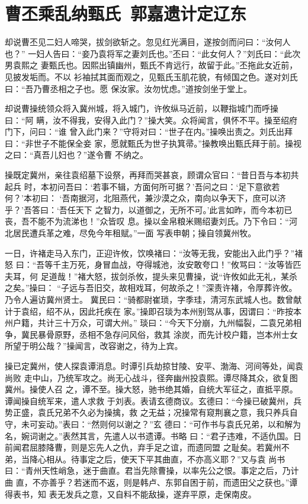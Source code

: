 \chapter{曹丕乘乱纳甄氏~郭嘉遗计定辽东}

却说曹丕见二妇人啼哭，拔剑欲斩之。忽见红光满目，遂按剑而问曰：“汝何人也？”
一妇人告曰：“妾乃袁将军之妻刘氏也。”丕曰：“此女何人？”刘氏曰：“此次男袁熙之
妻甄氏也。因熙出镇幽州，甄氏不肯远行，故留于此。”丕拖此女近前，见披发垢而。不以
衫袖拭其面而观之，见甄氏玉肌花貌，有倾国之色。遂对刘氏曰：“吾乃曹丞相之子也。愿
保汝家。汝勿忧虑。”道按剑坐于堂上。

却说曹操统领众将入冀州城，将入城门，许攸纵马近前，以鞭指城门而呼操曰：“阿
瞒，汝不得我，安得入此门？”操大笑。众将闻言，俱怀不平。操至绍府门下，问曰：“谁
曾入此门来？”守将对曰：“世子在内。”操唤出责之。刘氏出拜曰：“非世子不能保全妾
家，愿就甄氏为世子执箕帚。”操教唤出甄氏拜于前。操视之曰：“真吾儿妇也？”遂令曹
不纳之。

操既定冀州，亲往袁绍墓下设祭，再拜而哭甚哀，顾谓众官曰：“昔日吾与本初共起兵
时，本初问吾曰：‘若事不辑，方面何所可据？’吾问之曰：‘足下意欲若何？’本初曰：
‘吾南据河，北阻燕代，兼沙漠之众，南向以争天下，庶可以济乎？’吾答曰：‘吾任天下
之智力，以道御之，无所不可。’此言如昨，而今本初已丧，吾不能不为流涕也！”众皆叹
息。操以金帛粮米赐绍妻刘氏。乃下令曰：“河北居民遭兵革之难，尽免今年租赋。”一面
写表申朝；操自领冀州牧。

一日，许褚走马入东门，正迎许攸，饮唤褚曰：“汝等无我，安能出入此门乎？”褚怒
曰：“吾等千主万死，身冒血战，夺得城池，汝安敢夸口！”攸骂曰：“汝等皆匹夫耳，何
足道哉！”褚大怒，拔剑杀攸，提头来见曹操，说“许攸如此无礼，某杀之矣。”操曰：
“子远与吾旧交，故相戏耳，何故杀之！”深责许褚，令厚葬许攸。乃令人遍访冀州贤士。
冀民曰：“骑都尉崔琐，字季珪，清河东武城人也。数曾献计于袁绍，绍不从，因此托疾在
家。”操即召琰为本州别驾从事，因谓曰：“昨按本州户籍，共计三十万众，可谓大州。”
琰曰：“今天下分崩，九州幅裂，二袁兄弟相争，冀民暴骨原野，丞相不急存问风俗，救其
涂炭，而先计校户籍，岂本州士女所望于明公哉？”操闻言，改容谢之，待为上宾。

操已定冀州，使人探袁谭消息。时谭引兵劫掠甘陵、安平、渤海、河间等处，闻袁尚败
走中山，乃统军攻之。尚无心战斗，径奔幽州投袁熙。谭尽降其众，欲复图冀州。操使人召
之，谭不至。操大怒，驰书绝其婚，自统大军征之，直抵平原。谭闻操自统军来，遣人求救
于刘表。表请玄德商议。玄德曰：“今操已破冀州，兵势正盛，袁氏兄弟不久必为操擒，救
之无益；况操常有窥荆襄之意，我只养兵自守，未可妄动。”表曰：“然则何以谢之？”玄
德曰：“可作书与袁氏兄弟，以和解为名，婉词谢之。”表然其言，先遣人以书遗谭。书略
曰：“君子违难，不适仇国。日前闻君屈膝降曹，则是忘先人之仇，弃手足之谊，而遗同盟
之耻矣。若冀州不弟，当降心相从。待事定之后，使天下平其曲直，不亦高义耶？”又与袁
尚书曰：“青州天性峭急，迷于曲直。君当先除曹操，以率先公之恨。事定之后，乃计曲
直，不亦善乎？若迷而不返，则是韩卢、东郭自困于前，而遗田父之获也。”谭得表书，知
表无发兵之意，又自料不能敌操，遂弃平原，走保南皮。

